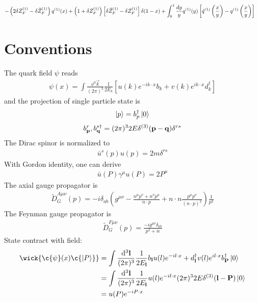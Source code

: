 \documentclass{article}
\DeclarePairedDelimiter\BraceM\{\}
\DeclarePairedDelimiter\bracketM{[}{]}
\let\Bqty\relax
\let\bqty\relax
\newcommand{\Bqty}[1]{\BraceM*{#1}}
\newcommand{\bqty}[1]{\bracketM*{#1}}
\newcommand{\mme}[1]{\frac{\dd^3\vb{#1}}{(2\pi)^3}}
\begin{document}
\begin{align}
\begin{aligned}[t]
		-\left(2\delta Z_{F}^{(1)}-\delta \tilde{Z}_{F}^{(1)}\right)q^{(1)}(x)+\left(1+\delta Z_{F}^{(1)}\right)\left[\delta \tilde{Z}_{F}^{(1)}-\delta Z_{F}^{(1)}\right] \delta(1-x)+\int_{0}^{1} \frac{d y}{y}q^{(1)}(y)\left[\tilde{q}^{(1)}\left(\frac{x}{y}\right)-q^{(1)}\left(\frac{x}{y}\right)\right] &
	\end{aligned}\notag \\
\end{align}

\appendix
\section{Conventions\label{sec:conv}}
The quark field $\psi$ reads
\begin{align}
	\psi(x)=\int \frac{\dd^{3} \vec{k}}{(2 \pi)^{3}} \frac{1}{2 E_{k}}\left[u(k) e^{-i k \cdot x} b_{k}+v(k)e^{ik\cdot x} d_{k}^{\dagger}\right]
\end{align}
and the projection of single particle state is
\begin{align}
	\ket{p}=b_p^{\dagger}\ket{0}
\end{align}
\begin{align}
	\Bqty{b_{\vb{p}}^r,b_{\vb{q}}^{s\dagger}}=(2\pi)^32E\delta^{(3)}(\vb{p}-\vb{q})\delta^{rs}
\end{align}
The Dirac spinor is normalized to
\begin{align}
	\bar u^s(p) u(p)=2m\delta^{rs}
\end{align}
With Gordon identity, one can derive\cite{Srednicki2007}
\begin{align}
	\bar u(P) \gamma^\mu u(P) =2P^\mu
\end{align}
The axial gauge propagator is
\begin{align}
	\tilde D_G^{A\mu\nu}(p)=-i \delta_{a b}\left(g^{\mu \nu}-\frac{n^{\mu} p^{\nu}+n^{\nu} p^{\mu}}{n \cdot p}+n \cdot n \frac{p^{\mu} p^{\nu}}{(n \cdot p)^{2}}\right) \frac{1}{p^{2}}
\end{align}
The Feynman gauge propagator is
\begin{align}
	\tilde D_G^{F\mu\nu}(p)= \frac{-i g^{\mu\nu} \delta_{a b}}{p^{2}+i\epsilon}
\end{align}
State contract with field:
\begin{align}
	\wick{\c{\psi}(x)\c{\ket{P}}} & =\int\mme{l}\frac{1}{2E_{\vb{l}}}\bqty{b_{\vb{l}}u(l)e^{-il\cdot x}+d_{\vb{l}}^{\dagger}v(l)e^{il\cdot x}}b_{\vb{P}}^{\dagger}\ket{0}\notag \\
	                              & =\int\mme{l}\frac{1}{2E_{\vb{l}}}u(l)e^{-il\cdot x}(2\pi)^32E\delta^{(3)}(\vb{l}-\vb{P})\ket{0}\notag                                       \\
	                              & =u(P)e^{-iP\cdot x}
\end{align}
\end{document}
